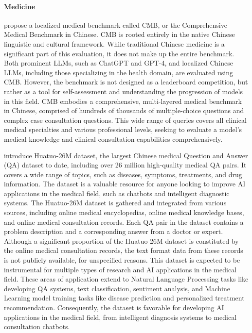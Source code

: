 {\paragraph{Medicine}}
\citet{wang2023cmb} propose a localized medical benchmark called CMB, or the Comprehensive Medical Benchmark in Chinese. CMB is rooted entirely in the native Chinese linguistic and cultural framework. While traditional Chinese medicine is a significant part of this evaluation, it does not make up the entire benchmark.
Both prominent LLMs, such as ChatGPT and GPT-4, and localized Chinese LLMs, including those specializing in the health domain, are evaluated using CMB. However, the benchmark is not designed as a leaderboard competition, but rather as a tool for self-assessment and understanding the progression of models in this field.
CMB embodies a comprehensive, multi-layered medical benchmark in Chinese, comprised of hundreds of thousands of multiple-choice questions and complex case consultation questions. This wide range of queries covers all clinical medical specialties and various professional levels, seeking to evaluate a model's medical knowledge and clinical consultation capabilities comprehensively.
 
\citet{li2023huatuo} introduce Huatuo-26M dataset, the largest Chinese medical Question and Answer (QA) dataset to date, including over 26 million high-quality medical QA pairs. It covers a wide range of topics, such as diseases, symptoms, treatments, and drug information. The dataset is a valuable resource for anyone looking to improve AI applications in the medical field, such as chatbots and intelligent diagnostic systems.
The Huatuo-26M dataset is gathered and integrated from various sources, including online medical encyclopedias, online medical knowledge bases, and online medical consultation records. Each QA pair in the dataset contains a problem description and a corresponding answer from a doctor or expert. Although a significant proportion of the Huatuo-26M dataset is constituted by the online medical consultation records, the text format data from these records is not publicly available, for unspecified reasons.
This dataset is expected to be instrumental for multiple types of research and AI applications in the medical field. These areas of application extend to Natural Language Processing tasks like developing QA systems, text classification, sentiment analysis, and Machine Learning model training tasks like disease prediction and personalized treatment recommendation. Consequently, the dataset is favorable for developing AI applications in the medical field, from intelligent diagnosis systems to medical consultation chatbots.

